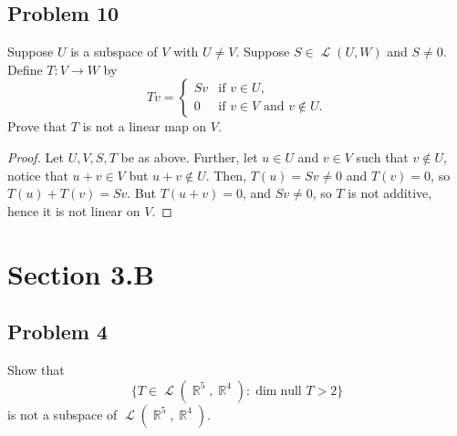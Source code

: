 \documentclass[letterpaper, 12pt]{amsart}
\DeclareMathOperator{\R}{\mathbb{R}}
\renewcommand{\null}{\text{null }}
\DeclareMathOperator{\Ell}{\mathscr{L}}
\theoremstyle{definition}  %
\begin{document}
		\subsection*{Problem 10}
		Suppose $U$ is a subspace of $V$ with $U \neq V$.
		Suppose $S \in \Ell(U,W)$ and $S \neq 0$.
		Define $T : V \to W$ by $$Tv = \begin{cases} Sv & \text{if $v \in U$}, \\ 0 & \text{if $v \in V$ and $v \notin U$}. \end{cases}$$
		Prove that $T$ is not a linear map on $V$.

		\begin{proof}
		Let $U,V,S,T$ be as above.
		Further, let $u \in U$ and $v \in V$ such that $v \notin U$, notice that $u+v \in V$ but $u+v \notin U$.
		Then, $T(u) = Sv \neq 0$ and $T(v) = 0$, so $T(u) + T(v) = Sv$.
		But $T(u+v) = 0$, and $Sv \neq 0$, so $T$ is not additive, hence it is not linear on $V$.
		\end{proof}

	\section*{Section 3.B}
		\subsection*{Problem 4}
		Show that $$\{ T \in \Ell(\R^{5}, \R^{4}) : \dim \null T > 2 \}$$ is not a subspace of $\Ell(\R^{5}, \R^{4})$.
\end{document}
